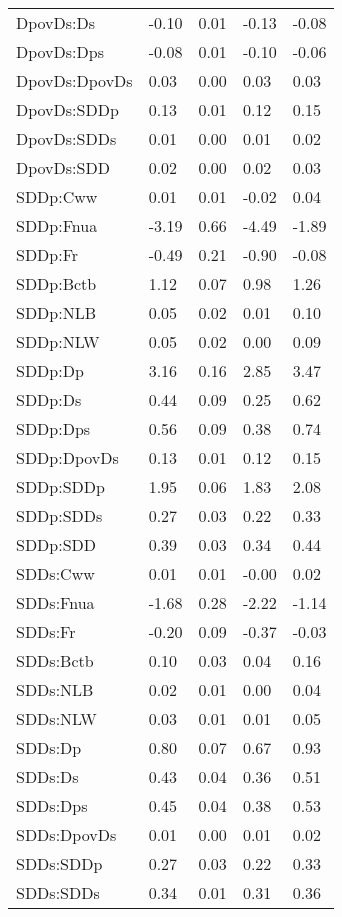 \begin{center}
\begin{longtable}{|p{0.9in}|p{0.7in}|p{0.7in}|p{0.7in}|p{0.7in}|}
   DpovDs:Ds & -0.10 & 0.01 & -0.13 & -0.08 \\ 
   DpovDs:Dps & -0.08 & 0.01 & -0.10 & -0.06 \\ 
   DpovDs:DpovDs & 0.03 & 0.00 & 0.03 & 0.03 \\ 
   DpovDs:SDDp & 0.13 & 0.01 & 0.12 & 0.15 \\ 
   DpovDs:SDDs & 0.01 & 0.00 & 0.01 & 0.02 \\ 
   DpovDs:SDD & 0.02 & 0.00 & 0.02 & 0.03 \\ 
   SDDp:Cww & 0.01 & 0.01 & -0.02 & 0.04 \\ 
   SDDp:Fnua & -3.19 & 0.66 & -4.49 & -1.89 \\ 
   SDDp:Fr & -0.49 & 0.21 & -0.90 & -0.08 \\ 
   SDDp:Bctb & 1.12 & 0.07 & 0.98 & 1.26 \\ 
   SDDp:NLB & 0.05 & 0.02 & 0.01 & 0.10 \\ 
   SDDp:NLW & 0.05 & 0.02 & 0.00 & 0.09 \\ 
   SDDp:Dp & 3.16 & 0.16 & 2.85 & 3.47 \\ 
   SDDp:Ds & 0.44 & 0.09 & 0.25 & 0.62 \\ 
   SDDp:Dps & 0.56 & 0.09 & 0.38 & 0.74 \\ 
   SDDp:DpovDs & 0.13 & 0.01 & 0.12 & 0.15 \\ 
   SDDp:SDDp & 1.95 & 0.06 & 1.83 & 2.08 \\ 
   SDDp:SDDs & 0.27 & 0.03 & 0.22 & 0.33 \\ 
   SDDp:SDD & 0.39 & 0.03 & 0.34 & 0.44 \\ 
   SDDs:Cww & 0.01 & 0.01 & -0.00 & 0.02 \\ 
   SDDs:Fnua & -1.68 & 0.28 & -2.22 & -1.14 \\ 
   SDDs:Fr & -0.20 & 0.09 & -0.37 & -0.03 \\ 
   SDDs:Bctb & 0.10 & 0.03 & 0.04 & 0.16 \\ 
   SDDs:NLB & 0.02 & 0.01 & 0.00 & 0.04 \\ 
   SDDs:NLW & 0.03 & 0.01 & 0.01 & 0.05 \\ 
   SDDs:Dp & 0.80 & 0.07 & 0.67 & 0.93 \\ 
   SDDs:Ds & 0.43 & 0.04 & 0.36 & 0.51 \\ 
   SDDs:Dps & 0.45 & 0.04 & 0.38 & 0.53 \\ 
   SDDs:DpovDs & 0.01 & 0.00 & 0.01 & 0.02 \\ 
   SDDs:SDDp & 0.27 & 0.03 & 0.22 & 0.33 \\ 
   SDDs:SDDs & 0.34 & 0.01 & 0.31 & 0.36 \\ 

\end{longtable}
\end{center}
